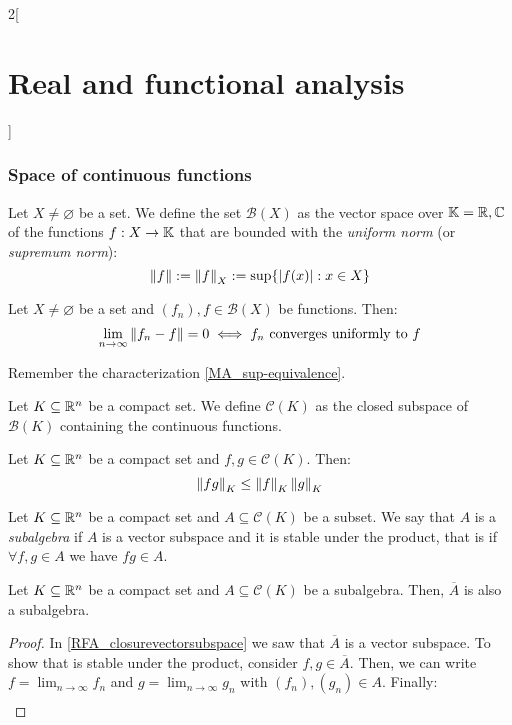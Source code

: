 \documentclass[../../../main_math.tex]{subfiles}
\begin{document}
\begin{multicols}{2}[\section{Real and functional analysis}]
  \subsubsection{Space of continuous functions}
  \begin{definition}
    Let $X\ne \varnothing$ be a set. We define the set $\mathcal{B}(X)$ as the vector space over $\mathbb{K}=\mathbb{R},\mathbb{C}$ of the functions $f:X\rightarrow\mathbb{K}$ that are bounded with the \emph{uniform norm} (or \emph{supremum norm}): $$\left\|f\right\|:=\left\|f\right\|_X:=\sup\{\abs{f(x)}:x\in X\}$$
  \end{definition}
  \begin{proposition}
    Let $X\ne \varnothing$ be a set and $(f_n),f\in\mathcal{B}(X)$ be functions. Then: $$\lim_{n\to\infty}\left\|f_n-f\right\|=0\iff f_n\text{ converges uniformly to }f$$
  \end{proposition}
  \begin{sproof}
    Remember the characterization \cref{MA_sup-equivalence}.
  \end{sproof}
  \begin{definition}
    Let $K\subseteq \mathbb{R}^n$ be a compact set. We define $\mathcal{C}(K)$ as the closed subspace of $\mathcal{B}(K)$ containing the continuous functions.
  \end{definition}
  \begin{proposition}
    Let $K\subseteq \mathbb{R}^n$ be a compact set and $f,g\in\mathcal{C}(K)$. Then: $$\left\|fg\right\|_K\leq\left\|f\right\|_K\left\|g\right\|_K$$
  \end{proposition}
  \begin{definition}
    Let $K\subseteq \mathbb{R}^n$ be a compact set and $A\subseteq \mathcal{C}(K)$ be a subset. We say that $A$ is a \emph{subalgebra} if $A$ is a vector subspace and it is stable under the product, that is if $\forall f,g\in A$ we have $fg\in A$.
  \end{definition}
  \begin{proposition}
    Let $K\subseteq \mathbb{R}^n$ be a compact set and $A\subseteq \mathcal{C}(K)$ be a subalgebra. Then, $\overline{A}$ is also a subalgebra.
  \end{proposition}
  \begin{proof}
    In \cref{RFA_closurevectorsubspace} we saw that $\overline{A}$ is a vector subspace. To show that is stable under the product, consider $f,g\in\overline{A}$. Then, we can write $\displaystyle f=\lim_{n\to\infty} f_n$ and $\displaystyle g=\lim_{n\to\infty} g_n$ with $(f_n), (g_n)\in A$. Finally:
    \begin{align*}

\end{align*}
\end{proof}
\end{multicols}
\end{document}
